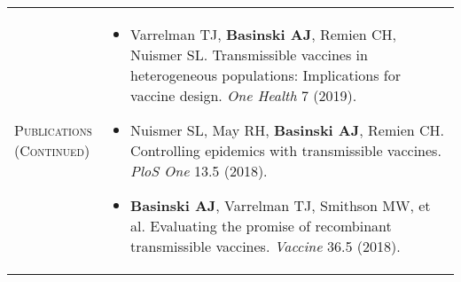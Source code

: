 \documentclass[11pt]{article}
\newcommand{\cellone}{3.5cm} %
\newcommand{\celltwo}{11cm}
\newcommand{\spa}{\vspace{.4in}}
\begin{document}
\newpage

\begin{tabularx}{\textwidth}{p{\cellone} p{\celltwo}}
  \parbox[t][0cm]{\cellone}{P\textsc{ublications} \\ \textsc{(Continued)}} &  \parbox[t][0cm]{12cm}{ 

    \vspace{-0.65cm}
    \begin{itemize}

    \item Varrelman TJ, {\bf Basinski AJ}, Remien CH, Nuismer SL. Transmissible vaccines in heterogeneous populations: Implications for vaccine design. \emph{One Health} 7 (2019).
          
    \item Nuismer SL, May RH, {\bf Basinski AJ}, Remien CH. Controlling epidemics with transmissible vaccines. \emph{PloS One} 13.5 (2018).
      
      \vspace{0.05in}
      
    \item {\bf Basinski AJ}, Varrelman TJ, Smithson MW, et al. Evaluating the promise of recombinant transmissible vaccines. \emph{Vaccine} 36.5 (2018).
      
    \end{itemize}
  }
\end{tabularx}

\spa
\spa
\spa
\spa
\spa
\end{document}
